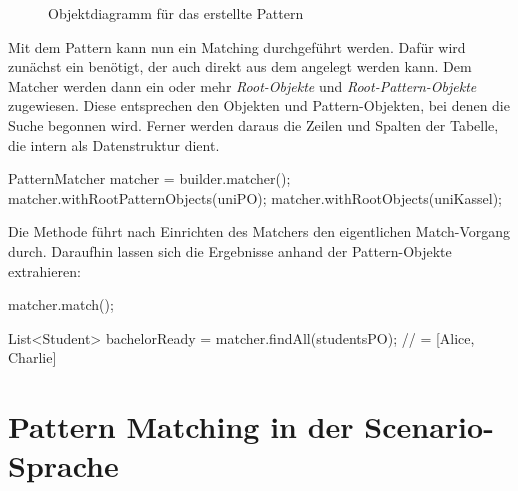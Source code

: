\begin{figure}
    \caption{Objektdiagramm für das erstellte Pattern}
    \label{fig:pattern-diagram}
\end{figure}

Mit dem Pattern kann nun ein Matching durchgeführt werden.
Dafür wird zunächst ein  benötigt, der auch direkt aus dem  angelegt werden kann.
Dem Matcher werden dann ein oder mehr \emph{Root-Objekte} und \emph{Root-Pattern-Objekte} zugewiesen.
Diese entsprechen den Objekten und Pattern-Objekten, bei denen die Suche begonnen wird.
Ferner werden daraus die Zeilen und Spalten der Tabelle, die intern als Datenstruktur dient.

\begin{jcodeblock}
    PatternMatcher matcher = builder.matcher();
    matcher.withRootPatternObjects(uniPO);
    matcher.withRootObjects(uniKassel);
\end{jcodeblock}

Die Methode  führt nach Einrichten des Matchers den eigentlichen Match-Vorgang durch.
Daraufhin lassen sich die Ergebnisse anhand der Pattern-Objekte extrahieren:

\begin{jcodeblock}
    matcher.match();

    List<Student> bachelorReady = matcher.findAll(studentsPO);
    // = [Alice, Charlie]
\end{jcodeblock}


\section{Pattern Matching in der Scenario-Sprache}\label{sec:scenario-pattern-matching}

